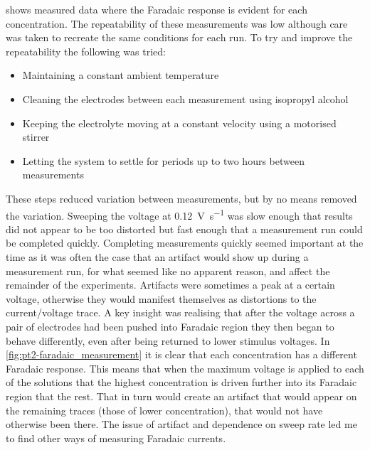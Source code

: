        shows measured data where the Faradaic response is evident for each concentration.
      The repeatability of these measurements was low although care was taken to recreate the same conditions for each run.
      To try and improve the repeatability the following was tried:
      \begin{itemize}
        \item Maintaining a constant ambient temperature
        \item Cleaning the electrodes between each measurement using isopropyl alcohol
        \item Keeping the electrolyte moving at a constant velocity using a motorised stirrer
        \item Letting the system to settle for periods up to two hours between measurements
      \end{itemize}
      These steps reduced variation between measurements, but by no means removed the variation.
      Sweeping the voltage at \SI{0.12}{\volt\per\second} was slow enough that results did not appear to be too distorted but fast enough that a measurement run could be completed quickly.
      Completing measurements quickly seemed important at the time as it was often the case that an artifact would show up during a measurement run, for what seemed like no apparent reason, and affect the remainder of the experiments.
      Artifacts were sometimes a peak at a certain voltage, otherwise they would manifest themselves as distortions to the current/voltage trace.
      A key insight was realising that after the voltage across a pair of electrodes had been pushed into Faradaic region they then began to behave differently, even after being returned to lower stimulus voltages.
      In \cref{fig:pt2-faradaic_measurement} it is clear that each concentration has a different Faradaic response.
      This means that when the maximum voltage is applied to each of the solutions that the highest concentration is driven further into its Faradaic region that the rest.
      That in turn would create an artifact that would appear on the remaining traces (those of lower concentration), that would not have otherwise been there.
      The issue of artifact and dependence on sweep rate led me to find other ways of measuring Faradaic currents.

